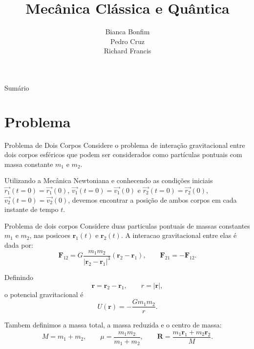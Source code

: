 \documentclass[10pt]{beamer}
\begin{document}
\title[Mecânica Clássica e Quântica]{Mecânica Clássica e Quântica} %


\author{  Bianca Bonfim\\
Pedro Cruz \\
Richard Francis\\

} %
\institute[MCCT] %
{
}

\begin{frame}
	\maketitle

\end{frame}


\begin{frame}{Sumário}
\tableofcontents
\end{frame}

\section{Problema}
\begin{frame}{Problema de Dois Corpos}
    Considere o problema de interação gravitacional entre dois corpos esféricos que podem
ser considerados como partículas pontuais com massa constante $m_1$ e $m_2$. 

Utilizando a Mecânica Newtoniana e conhecendo as condições iniciais $\vec{r_1}(t = 0) = \vec{r_1}(0)$,
$\vec{v_1}(t = 0) =\vec{v_1}(0)$ e $\vec{r_2}(t = 0) =\vec{r_2}(0)$, $\vec{v_2}(t = 0) = \vec{v_2}(0)$, devemos encontrar a posição de ambos corpos em cada instante de tempo $t$.
\end{frame}
\begin{frame}{Problema de dois corpos}
   Considere duas particulas pontuais de massas constantes $m_1$ e $m_2$, nas posicoes
$\bm r_1(t)$ e $\bm r_2(t)$. A interacao gravitacional entre elas é dada por:
\begin{equation}
\bm F_{12}
=G\frac{m_1m_2}{|\bm r_2-\bm r_1|^3}(\bm r_2-\bm r_1),
\qquad
\bm F_{21}=-\bm F_{12}.
\end{equation}

Definindo
\begin{equation}
\bm r=\bm r_2-\bm r_1,\qquad r=|\bm r|,
\end{equation}
o potencial gravitacional é
\begin{equation}
U(\bm r)=-\frac{Gm_1m_2}{r}.
\end{equation}

Tambem definimos a massa total, a massa reduzida e o centro de massa:
\begin{equation}
M=m_1+m_2,\qquad
\mu=\frac{m_1m_2}{m_1+m_2},\qquad
\bm R=\frac{m_1\bm r_1+m_2\bm r_2}{M}.
\end{equation}

\end{frame}
\end{document}
